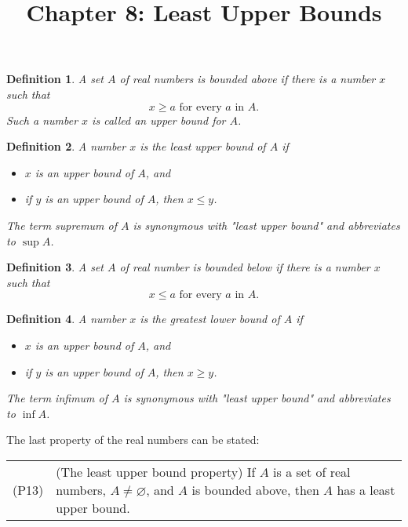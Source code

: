 \documentclass{article}
\newtheorem{definition}{Definition}
\begin{document}
\title{Chapter 8: Least Upper Bounds}
\maketitle

\begin{definition}
  A set $A$ of real numbers is \emph{bounded above} if there is a number $x$
  such that \begin{equation*}
    x \geq a \text{ for every } a \text{ in } A.
  \end{equation*}
  Such a number $x$ is called an \emph{upper bound} for $A$.
\end{definition}

\begin{definition}
  A number $x$ is the \emph{least upper bound} of $A$ if \begin{itemize}
    \item $x$ is an upper bound of $A$, and
    \item if $y$ is an upper bound of $A$, then $x \leq y$.
  \end{itemize}

  The term \emph{supremum} of $A$ is synonymous with "least upper bound" and
  abbreviates to $\sup A$.
\end{definition}

\begin{definition}
  A set $A$ of real number is \emph{bounded below} if there is a number $x$
  such that \begin{equation*}
    x \leq a \text{ for every } a \text{ in } A.
  \end{equation*}
\end{definition}

\begin{definition}
  A number $x$ is the \emph{greatest lower bound} of $A$ if \begin{itemize}
    \item $x$ is an upper bound of $A$, and
    \item if $y$ is an upper bound of $A$, then $x \geq y$.
  \end{itemize}

  The term \emph{infimum} of $A$ is synonymous with "least upper bound" and
  abbreviates to $\inf A$.
\end{definition}

The last property of the real numbers can be stated:

\begin{tabular}{l p{4in}}
  (P13) & (The least upper bound property) If $A$ is a set of real numbers, $A
  \neq \varnothing$, and $A$ is bounded above, then $A$ has a least upper
  bound.
\end{tabular}
\end{document}
